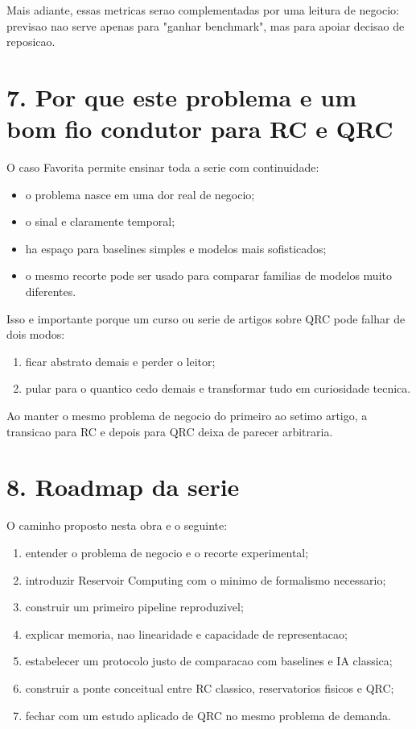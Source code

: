 \documentclass[12pt]{article}
\providecommand{\tightlist}{%
  \setlength{\itemsep}{0pt}\setlength{\parskip}{0pt}}
\begin{document}
Mais adiante, essas metricas serao complementadas por uma leitura de negocio: previsao nao serve apenas para "ganhar benchmark", mas para apoiar decisao de reposicao.

\section{7. Por que este problema e um bom fio condutor para RC e QRC}\label{7-por-que-este-problema-e-um-bom-fio-condutor-para-rc-e-qrc}

O caso Favorita permite ensinar toda a serie com continuidade:

\begin{itemize}
\tightlist
\item
  o problema nasce em uma dor real de negocio;
\item
  o sinal e claramente temporal;
\item
  ha espaço para baselines simples e modelos mais sofisticados;
\item
  o mesmo recorte pode ser usado para comparar familias de modelos muito diferentes.
\end{itemize}

Isso e importante porque um curso ou serie de artigos sobre QRC pode falhar de dois modos:

\begin{enumerate}
\def\labelenumi{\arabic{enumi}.}
\tightlist
\item
  ficar abstrato demais e perder o leitor;
\item
  pular para o quantico cedo demais e transformar tudo em curiosidade tecnica.
\end{enumerate}

Ao manter o mesmo problema de negocio do primeiro ao setimo artigo, a transicao para RC e depois para QRC deixa de parecer arbitraria.

\section{8. Roadmap da serie}\label{8-roadmap-da-serie}

O caminho proposto nesta obra e o seguinte:

\begin{enumerate}
\def\labelenumi{\arabic{enumi}.}
\tightlist
\item
  entender o problema de negocio e o recorte experimental;
\item
  introduzir Reservoir Computing com o minimo de formalismo necessario;
\item
  construir um primeiro pipeline reproduzivel;
\item
  explicar memoria, nao linearidade e capacidade de representacao;
\item
  estabelecer um protocolo justo de comparacao com baselines e IA classica;
\item
  construir a ponte conceitual entre RC classico, reservatorios fisicos e QRC;
\item
  fechar com um estudo aplicado de QRC no mesmo problema de demanda.
\end{enumerate}
\end{document}
